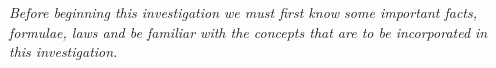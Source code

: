 \textit{Before beginning this investigation we must first know some important facts, formulae, laws and be familiar with the concepts that are to be incorporated in this investigation.}

        
        
        
        
        
        
        
      
        
        
        
            
        
